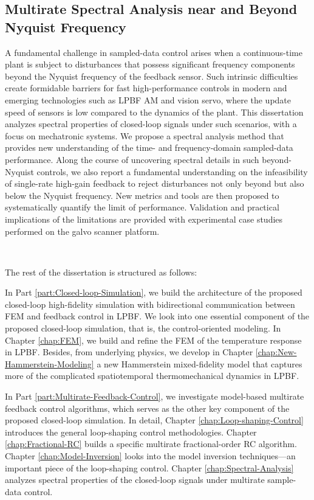 \documentclass [11pt, proquest] {uwthesis}[2020/02/24]
\begin{document}
\subsection*{Multirate Spectral Analysis near and Beyond Nyquist Frequency}
A fundamental challenge in sampled-data control arises when a continuous-time plant is subject to disturbances that possess significant frequency components beyond the Nyquist frequency of the feedback sensor. Such intrinsic difficulties create formidable barriers for fast high-performance controls in modern and emerging technologies such as LPBF AM and vision servo, where the update speed of sensors is low compared to the dynamics of the plant. This dissertation analyzes spectral properties of closed-loop signals under such scenarios, with a focus on mechatronic systems. We propose a spectral analysis method that provides new understanding of the time- and frequency-domain sampled-data performance. Along the course of uncovering spectral details in such beyond-Nyquist controls, we also report a fundamental understanding on the infeasibility of single-rate high-gain feedback to reject disturbances not only beyond but also below the Nyquist frequency. New metrics and tools are then proposed to systematically quantify the limit of performance. Validation and practical implications of the limitations are provided with experimental case studies performed on the galvo scanner platform.

\

\noindent The rest of the dissertation is structured as follows:

In Part \ref{part:Closed-loop-Simulation}, we build the architecture of the proposed closed-loop high-fidelity simulation with bidirectional communication between FEM and feedback control in LPBF. We look into one essential component of the proposed closed-loop simulation, that is, the control-oriented modeling. In Chapter \ref{chap:FEM}, we build and refine the FEM of the temperature response in LPBF. Besides, from underlying physics, we develop in Chapter \ref{chap:New-Hammerstein-Modeling} a new Hammerstein mixed-fidelity model that captures more of the complicated spatiotemporal thermomechanical dynamics in LPBF.

In Part \ref{part:Multirate-Feedback-Control}, we investigate model-based multirate feedback control algorithms, which serves as the other key component of the proposed closed-loop simulation. In detail, Chapter \ref{chap:Loop-shaping-Control} introduces the general loop-shaping control methodologies. Chapter \ref{chap:Fractional-RC} builds a specific multirate fractional-order RC algorithm. Chapter \ref{chap:Model-Inversion} looks into the model inversion techniques---an important piece of the loop-shaping control. Chapter \ref{chap:Spectral-Analysis} analyzes spectral properties of the closed-loop signals under multirate sample-data control.
\end{document}
